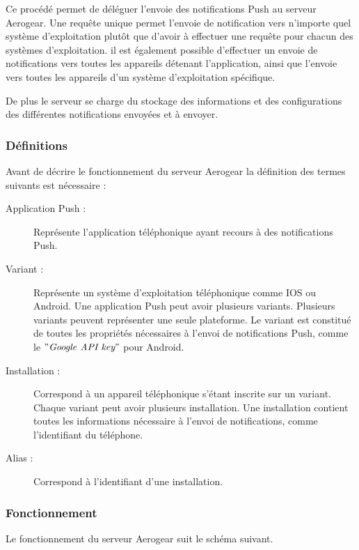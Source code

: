 Ce procédé permet de déléguer l'envoie des notifications Push au serveur Aerogear. Une requête unique permet l'envoie de notification vers n'importe quel système d'exploitation plutôt que d'avoir à effectuer une requête pour chacun des systèmes d'exploitation. il est également possible d'effectuer un envoie de notifications vers toutes les appareils détenant l'application, ainsi que l'envoie vers toutes les appareils d'un système d'exploitation spécifique.

De plus le serveur se charge du stockage des informations et des configurations des différentes notifications envoyées et à envoyer.

\subsubsection{Définitions} 

Avant de décrire le fonctionnement du serveur Aerogear la définition des termes suivants est nécessaire :

\begin{description}
 \item[Application Push :] Représente l'application téléphonique ayant recours à des notifications Push.
 \item[Variant :] Représente un système d'exploitation téléphonique comme IOS ou Android. Une application Push peut avoir plusieurs variants. Plusieurs variants peuvent représenter une seule plateforme. Le variant est constitué de toutes les propriétés nécessaires à l'envoi de notifications Push, comme le $"\textit{Google API key}"$ pour Android.
 \item[Installation :] Correspond à un appareil téléphonique s'étant inscrite sur un variant. Chaque variant peut avoir plusieurs installation. Une installation contient toutes les informations nécessaire à l'envoi de notifications, comme l'identifiant du téléphone.
 \item[Alias :] Correspond à l'identifiant d'une installation.
\end{description}

\subsubsection{Fonctionnement}

Le fonctionnement du serveur Aerogear suit le schéma suivant.


